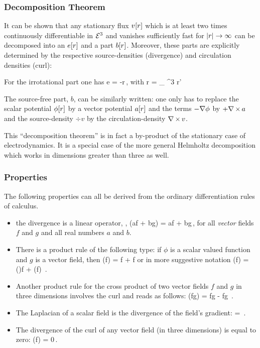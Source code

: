 \subsubsection{Decomposition Theorem}
It can be shown that any stationary flux $v\!\left[{r}\right]$ which is at least two times continuously differentiable in $\mathcal{E}^{3}$ and vanishes sufficiently fast for $\lvert{r}\rvert\to\infty$ can be decomposed into an  $e\!\left[{r}\right]$  and a  part $b\!\left[{r}\right]$. Moreover, these parts are explicitly determined by the respective source-densities (divergence) and circulation densities (curl):

For the irrotational part one has
\beq
e = -\gder \phi\vat r\,,
\eeq
with
\beq
\phi\vat r = \int_{} \dx^3 r'\,
\eeq

The source-free part, $b$, can be similarly written: one only has to replace the scalar potential $\phi\!\left[{r}\right]$ by a vector potential $a\!\left[{r}\right]$ and the terms $-\nabla\phi$ by $+\nabla\operatorname{\times} a$ and the source-density $\div v$ by the circulation-density $\nabla\operatorname{\times} v$.

This ``decomposition theorem'' is in fact a by-product of the stationary case of electrodynamics. It is a special case of the more general Helmholtz decomposition which works in dimensions greater than three as well.


\subsubsection{Properties}
The following properties can all be derived from the ordinary differentiation rules of calculus. 

\begin{itemize}
%
\item the divergence is a linear operator, \ie,
\beq
\div(af + bg) = a\div f + b\div g\,,
\eeq
for all \emph{vector} fields $f$ and $g$ and all real numbers $a$ and $b$.
%
\item There is a product rule of the following type: if $\phi$ is a scalar valued function and $g$ is a vector field, then
\beq
\div(\phi f) = \grad\phi\iprod f + \phi\div f
\eeq
or in more suggestive notation
\beq
\gder\iprod(\phi f) = (\gder\phi)\iprod f + \phi (\gder\iprod f) \,.
\eeq
%
\item Another product rule for the cross product of two vector fields $f$ and $g$ in three dimensions involves the curl and reads as follows:
\beq
\div(f\cprod g) = \curl f\iprod g - f\iprod\curl g \,.
\eeq
%
\item The Laplacian of a scalar field is the divergence of the field's gradient:
\beq
\lder\phi = \div\grad\phi \,.
\eeq
%
\item The divergence of the curl of any vector field (in three dimensions) is equal to zero:
\beq
\gder\iprod(\gder\cprod f) = 0\,.
\eeq
%
\end{itemize}


